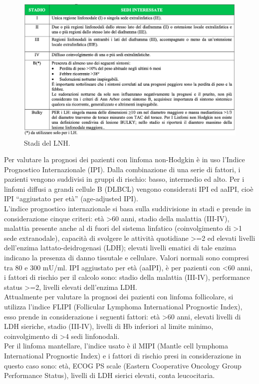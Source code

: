\begin{figure}[H]
    \begin{center}
    \includegraphics[width=0.95\columnwidth]{img/LUGANOAIOM.png}
    \end{center}
    \caption[Stadi del LNH.]{Stadi del LNH.
    \cite{img17}}

\end{figure}

Per valutare la prognosi dei pazienti con linfoma non-Hodgkin è in uso l’Indice Prognostico Internazionale (IPI). 
Dalla combinazione di una serie di fattori, i pazienti vengono suddivisi in gruppi di rischio: basso, intermedio 
ed alto. 
Per i linfomi diffusi a grandi cellule B (DLBCL) vengono considerati IPI ed aaIPI, cioè IPI “aggiustato per età” 
(age-adjusted IPI)\cite{AIOM}.\\
L’indice prognostico internazionale si basa sulla suddivisione in stadi e prende in considerazione cinque criteri: 
età >60 anni, stadio della malattia (III-IV), malattia presente anche al di fuori del sistema linfatico 
(coinvolgimento di >1 sede extranodale), capacità di svolgere le attività quotidiane >=2 ed elevati livelli 
dell’enzima lattato-deidrogenasi (LDH); elevati livelli ematici di tale enzima indicano la presenza di 
danno tissutale e cellulare. Valori normali sono compresi tra 80 e 300 mU/ml. 
IPI aggiustato per età (aaIPI), è per pazienti con <60 anni, i fattori di rischio per il calcolo sono: 
stadio della malattia (III-IV), performance status >=2, livelli elevati dell’enzima LDH\cite{AIOM}.\\
Attualmente per valutare la prognosi dei pazienti con linfoma follicolare, si utilizza l’indice FLIPI 
(Follicular Lymphoma International Prognostic Index), esso prende in considerazione i seguenti fattori: 
età >60 anni, elevati livelli di LDH sieriche, stadio (III-IV), livelli di Hb inferiori al limite minimo, 
coinvolgimento di >4 sedi linfonodali\cite{AIOM}.\\
Per il linfoma mantellare, l’indice usato è il MIPI (Mantle cell lymphoma International Prognostic Index) e 
i fattori di rischio presi in considerazione in questo caso sono: età, ECOG PS scale 
(Eastern Cooperative Oncology Group Performance Status), livelli di LDH sierici elevati, conta leucocitaria\cite{MIPI}.\\

